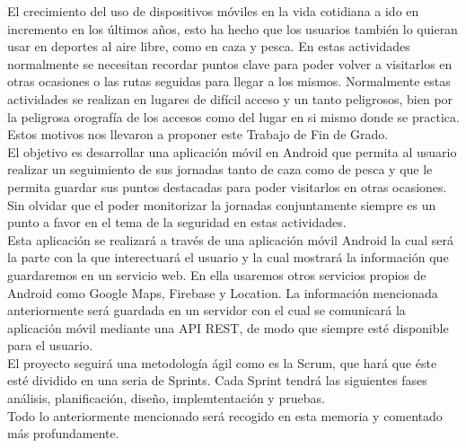 El crecimiento del uso de dispositivos móviles en la vida cotidiana a ido en incremento en los últimos años, esto ha hecho que los usuarios también lo quieran usar en deportes al aire libre, como en caza y pesca. En estas actividades normalmente se necesitan recordar puntos clave para poder volver a visitarlos en otras ocasiones o las rutas seguidas para llegar a los mismos. Normalmente estas actividades se realizan en lugares de difícil acceso y un tanto peligrosos, bien por la peligrosa orografía de los accesos como del lugar en si mismo donde se practica.\\

Estos motivos nos llevaron a proponer este Trabajo de Fin de Grado.\\


El objetivo es desarrollar una aplicación móvil en Android que permita al usuario realizar un seguimiento de sus jornadas tanto de caza como de pesca  y que le permita guardar sus puntos destacadas para poder visitarlos en otras ocasiones. Sin olvidar que el poder monitorizar la jornadas conjuntamente siempre es un punto a favor en el tema de la seguridad en estas actividades.\\



Esta aplicación se realizará a través de una aplicación móvil Android la cual será la parte con la que interectuará el usuario y la cual mostrará la información que guardaremos en un servicio web. En ella usaremos otros servicios propios de Android como Google Maps, Firebase y Location. La información mencionada anteriormente será guardada en un servidor con el cual se comunicará la aplicación móvil mediante una API REST, de modo que siempre esté disponible para el usuario.\\



El proyecto seguirá una metodología ágil como es la Scrum, que hará que éste esté dividido en una seria de Sprints. Cada Sprint tendrá las siguientes fases análisis, planificación, diseño, implemtentación y pruebas.\\

Todo lo anteriormente mencionado será recogido en esta memoria y comentado más profundamente.






